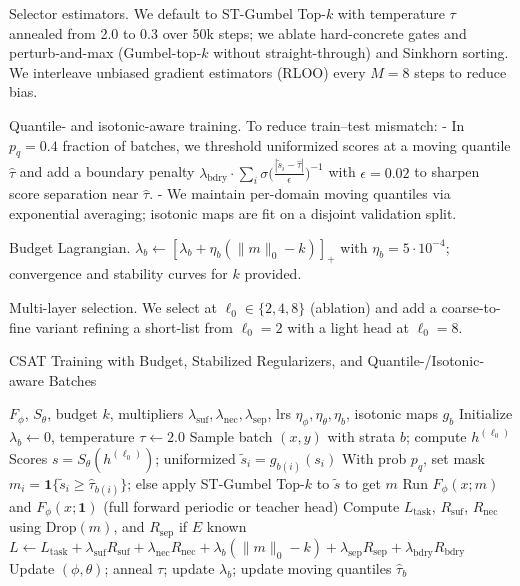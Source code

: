 \documentclass[11pt]{article}
\begin{document}
Selector estimators. We default to ST-Gumbel Top-$k$ with temperature $\tau$ annealed from 2.0 to 0.3 over 50k steps; we ablate hard-concrete gates and perturb-and-max (Gumbel-top-$k$ without straight-through) and Sinkhorn sorting. We interleave unbiased gradient estimators (RLOO) every $M{=}8$ steps to reduce bias.

Quantile- and isotonic-aware training. To reduce train–test mismatch:
- In $p_q{=}0.4$ fraction of batches, we threshold uniformized scores at a moving quantile $\hat{\tau}$ and add a boundary penalty $\lambda_{\text{bdry}}\cdot \sum_i \sigma\big(\frac{|\tilde{s}_i-\hat{\tau}|}{\epsilon}\big)^{-1}$ with $\epsilon{=}0.02$ to sharpen score separation near $\hat{\tau}$.
- We maintain per-domain moving quantiles via exponential averaging; isotonic maps are fit on a disjoint validation split.

Budget Lagrangian. $\lambda_b\leftarrow [\lambda_b+\eta_b(\|m\|_0-k)]_+$ with $\eta_b{=}5\cdot 10^{-4}$; convergence and stability curves for $k$ provided.

Multi-layer selection. We select at $\ell_0\in\{2,4,8\}$ (ablation) and add a coarse-to-fine variant refining a short-list from $\ell_0{=}2$ with a light head at $\ell_0{=}8$.

\begin{algorithm}[t]
\caption{CSAT Training with Budget, Stabilized Regularizers, and Quantile-/Isotonic-aware Batches}
\label{alg:train}
\begin{algorithmic}[1]
\Require $F_\phi$, $S_\theta$, budget $k$, multipliers $\lambda_{\text{suf}},\lambda_{\text{nec}},\lambda_{\text{sep}}$, lrs $\eta_\phi,\eta_\theta,\eta_b$, isotonic maps $g_b$
\State Initialize $\lambda_b \gets 0$, temperature $\tau \gets 2.0$
  \State Sample batch $(x,y)$ with strata $b$; compute $h^{(\ell_0)}$
  \State Scores $s=S_\theta(h^{(\ell_0)})$; uniformized $\tilde{s}_i=g_{b(i)}(s_i)$
  \State With prob $p_q$, set mask $m_i=\mathbf{1}\{\tilde{s}_i\ge \hat{\tau}_{b(i)}\}$; else apply ST-Gumbel Top-$k$ to $\tilde{s}$ to get $m$
  \State Run $F_\phi(x;m)$ and $F_\phi(x;\mathbf{1})$ (full forward periodic or teacher head)
  \State Compute $L_{\text{task}}$, $R_{\text{suf}}$, $R_{\text{nec}}$ using Drop$(m)$, and $R_{\text{sep}}$ if $E$ known
  \State $L \gets L_{\text{task}} + \lambda_{\text{suf}} R_{\text{suf}} + \lambda_{\text{nec}} R_{\text{nec}} + \lambda_b (\|m\|_0-k) + \lambda_{\text{sep}} R_{\text{sep}} + \lambda_{\text{bdry}} R_{\text{bdry}}$
  \State Update $(\phi,\theta)$; anneal $\tau$; update $\lambda_b$; update moving quantiles $\hat{\tau}_b$
\EndWhile
\end{algorithmic}
\end{algorithm}
\end{document}
